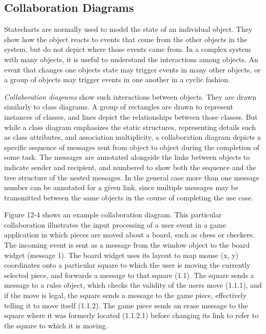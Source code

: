 \subsection{Collaboration Diagrams}
Statecharts are normally used to model the state of an individual
object. They show how the object reacts to events that come from the
other objects in the system, but do not depict where those events came
from. In a complex system with many objects, it is useful to understand
the interactions among objects. An event that changes one
object{\textquotesingle}s state may trigger events in many other
objects, or a group of objects may trigger events in one another in a
cyclic fashion.

\textit{Collaboration diagrams} show such
interactions between objects. They are drawn similarly to class
diagrams. A group of rectangles are drawn to represent
instances of classes, and lines depict the
relationships between those classes. But while a class diagram
emphasizes the static structures, representing details such as class
attributes, and association multiplicity, a collaboration diagram
depicts a specific sequence of messages sent from object to object
during the completion of some task. The messages are annotated
alongside the links between objects to indicate sender and recipient,
and numbered to show both the sequence and the tree
structure of the nested messages. In the general case more than one
message number can be annotated for a given link, since multiple messages may be transmitted between the
same objects in the course of completing the use case.

Figure 12-4 shows an example collaboration diagram. This particular
collaboration illustrates the input processing of a user event in a
game application in which pieces are moved about a board, such as chess
or checkers. The incoming event is sent as a message from the window
object to the board widget (message 1). The board widget uses its
layout to map mouse (x, y) coordinates onto a particular square to
which the user is moving the currently selected piece, and forwards a
message to that square (1.1). The square sends a message to a rules
object, which checks the validity of the user{\textquotesingle}s move
(1.1.1), and if the move is legal, the square sends a message to the
game piece, effectively telling it to move itself (1.1.2). The game
piece sends an {\textquotedbl}erase{\textquotedbl} message to the
square where it was formerly located (1.1.2.1) before changing its link
to refer to the square to which it is moving.

